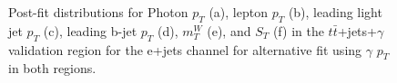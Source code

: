 \begin{figure}[]
\hfil  
{}
\caption{Post-fit distributions for Photon $p_T$ (a), lepton $p_T$ (b), leading light jet $p_T$ (c), leading b-jet $p_T$ (d),  $m_T^W$  (e), and $S_T$ (f) in the $t\bar{t}$+jets+$\gamma$ validation region for the  e+jets channel for alternative fit using  $\gamma$ $p_T$ in both regions. }
\end{figure}




















